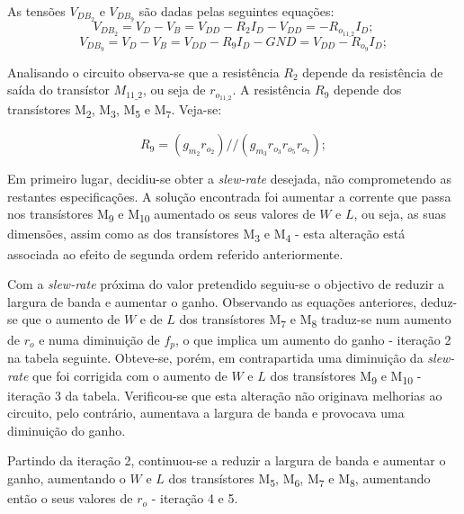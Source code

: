 \documentclass[11pt]{article}
\numberwithin{equation}{section}
\begin{document}
\vspace{3mm}

As tensões $V_{DB_2}$ e $V_{DB_9}$ são dadas pelas seguintes equações:
	\vspace{-3mm}
	\begin{equation}
	V_{DB_2} = V_D - V_B = V_{DD} - R_{2} I_D - V_{DD} = - R_{o_{11\_2}} I_D ;
	\end{equation}
	\begin{equation}
	V_{DB_9} = V_D - V_B = V_{DD} - R_{9} I_D - GND = V_{DD} - R_{o_9} I_D ;
	\end{equation}
	
\vspace{1mm}
Analisando o circuito observa-se que a resistência $R_{2}$ depende da resistência de saída do transístor  $M_{11\_2}$, ou seja de $r_{o_{11\_2}}$. A resistência $R_{9}$ depende dos transístores M\textsubscript{2}, M\textsubscript{3}, M\textsubscript{5} e M\textsubscript{7}. Veja-se:
	
\vspace{-3mm}
\begin{equation}
R_{9} = \left(g_{m_2}r_{o_2}\right)//\left(g_{m_3}r_{o_3}r_{o_5}r_{o_7}\right);
\end{equation}

Em primeiro lugar, decidiu-se obter a \textit{slew-rate} desejada, não comprometendo as restantes especificações. A solução encontrada foi aumentar a corrente que passa nos transístores M\textsubscript{9} e M\textsubscript{10} aumentado os seus valores de $W$ e $L$, ou seja, as suas dimensões, assim como as dos transístores M\textsubscript{3} e M\textsubscript{4} - esta alteração está associada ao efeito de segunda ordem referido anteriormente. 

Com a \textit{slew-rate} próxima do valor pretendido seguiu-se o objectivo de reduzir a largura de banda e aumentar o ganho. Observando as equações anteriores, deduz-se que o aumento de $W$ e de $L$ dos transístores M\textsubscript{7} e M\textsubscript{8} traduz-se num aumento de $r_o$ e numa diminuição de $f_p$, o que implica um aumento do ganho - iteração 2 na tabela seguinte. Obteve-se, porém, em contrapartida uma diminuição da \textit{slew-rate} que foi corrigida com o aumento de $W$ e $L$ dos transístores M\textsubscript{9} e M\textsubscript{10} - iteração 3 da tabela. Verificou-se que esta alteração não originava melhorias ao circuito, pelo contrário, aumentava a largura de banda e provocava uma diminuição do ganho.

Partindo da iteração 2, continuou-se a reduzir a largura de banda e aumentar o ganho, aumentando o $W$ e $L$ dos transístores M\textsubscript{5}, M\textsubscript{6}, M\textsubscript{7} e M\textsubscript{8}, aumentando então o seus valores de $r_o$ -  iteração 4 e 5. 
\end{document}
